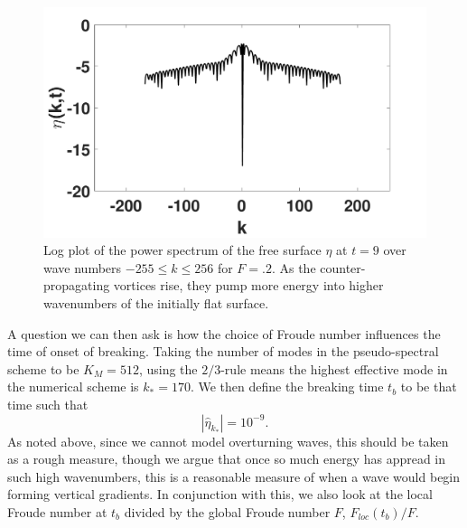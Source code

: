\documentclass[a4paper,11pt]{article}
\begin{document}
%
\begin{figure}[!h]
\centering
\includegraphics[width=.6\textwidth]{pspec_mu_pt2_F_pt2_tf_9}
\caption{\small Log plot of the power spectrum of the free surface $\eta$ at $t = 9$ over wave numbers $-255\leq k \leq 256$  for $F=.2$. As the counter-propagating vortices rise, they pump more energy into higher wavenumbers of the initially flat surface.}
\label{fig:pspecFpt2}
\end{figure}

A question we can then ask is how the choice of Froude number influences the time of onset of breaking.  Taking the number of modes in the pseudo-spectral scheme to be $K_{M}=512$, using the $2/3$-rule means the highest effective mode in the numerical scheme is $k_{\ast}=170$.  We then define the breaking time $t_{b}$ to be that time such that
\[
\left|\hat{\eta}_{k_{\ast}}\right| = 10^{-9}.  
\]
As noted above, since we cannot model overturning waves, this should be taken as a rough measure, though we argue that once so much energy has appread in such high wavenumbers, this is a reasonable measure of when a wave would begin forming vertical gradients.  In conjunction with this, we also look at the local Froude number at $t_{b}$ divided by the global Froude number $F$, $F_{loc}(t_{b})/F$.
\end{document}
